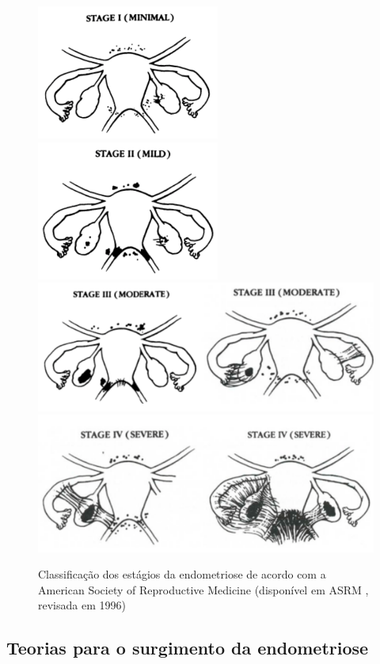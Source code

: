 \documentclass[12pt]{article} %
\begin{document}
\begin{figure}[h!]
\centering
\includegraphics[width=6cm]{stage1.png}
\includegraphics[width=6cm]{stage2.png}
\includegraphics[width=13cm]{stage3.png}
\includegraphics[width=13cm]{stage4.png}
\caption[Classificação dos estágios da endometriose]{ Classificação dos estágios da endometriose de acordo com a American Society of Reproductive Medicine (disponível em ASRM , revisada em 1996) } 
\label{Classificação dos estágios da endometriose}
\end{figure} 


\subsection{Teorias para o surgimento da endometriose}
\end{document}
